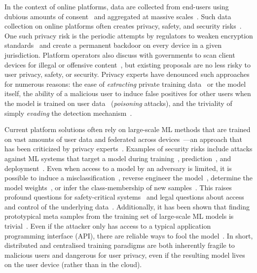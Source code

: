 \documentclass[preprint,12pt]{article}
\begin{document}
In the context of online platforms, data are collected from end-users using dubious amounts of consent~\cite{nouwens2020dark} and aggregated at massive scales~\cite{desislavov2021compute}. 
Such data collection on online platforms often creates privacy, safety, and security risks~\cite{chakraborty_adversarial_2018,meyers}. 
One such privacy risk is the periodic attempts by regulators to weaken encryption standards~\cite{amnesty_encryption} and create a permanent backdoor on every device in a given jurisdiction.
Platform operators also discuss with governments to scan client devices for illegal or offensive content~\cite{chat_control,apple_csam}, but existing proposals are no less risky to user privacy, safety, or security.
Privacy experts have denounced such approaches for numerous reasons: the ease of \textit{extracting} private training data~\cite{choquette2021label,fredrikson_model_2015,li2021membership} or the model~\cite{fredrikson_model_2015,orekondy2019knockoff,jagielski2020high,correia2018copycat,shokri2017membership} itself, the ability of a malicious user to induce false positives for other users when the model is trained on user data~\cite{rawat2022devil,shokri2020bypassing,gu2017badnets,saha2020hidden,aghakhani2021bullseye,turner2018clean,shafahi2018poison,geiping2020witches,souri2022sleeper} (\textit{poisoning} attacks), and the triviality of simply \textit{evading} the detection mechanism~\cite{carlini_towards_2017,dohmatob_generalized_2019,hopskipjump,biggio_evasion_2013,meyers,chakraborty_adversarial_2018,deepfool,hopskipjump}.

Current platform solutions often rely on large-scale ML methods that are trained on vast amounts of user data and federated across devices~\cite{apple_csam}---an approach that has been criticized by privacy experts~\cite{chat_control}. 
Examples of security risks include attacks against ML systems that target a model during training~\cite{biggio_poisoning_2013}, prediction~\cite{biggio_evasion_2013,deepfool,carlini_towards_2017}, and deployment~\cite{distributed_attacks,santos2021universal}. 
Even when access to a model by an adversary is limited, it is possible to induce a misclassification~\cite{hopskipjump}, reverse engineer the model~\cite{extraction_attack}, determine the model weights~\cite{jagielski2020high}, or infer the class-membership of new samples~\cite{bentley2020quantifying}. 
This raises profound questions for safety-critical systems~\cite{meyers} and legal questions about access and control of the underlying data~\cite{mitrou2018data,marks2023ai}.
Additionally, it has been shown that finding prototypical meta samples from the training set of large-scale ML models is trivial~\cite{chakraborty_adversarial_2018}. 
Even if the attacker only has access to a typical application programming interface (API), there are reliable ways to fool the model~\cite{hopskipjump}. 
In short, distributed and centralised training paradigms are both inherently fragile to malicious users and dangerous for user privacy, even if the resulting model lives on the user device (rather than in the cloud). 
\end{document}
